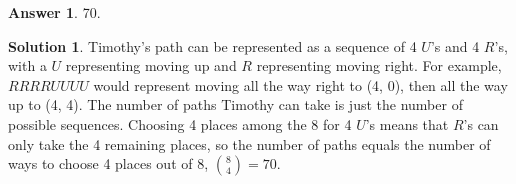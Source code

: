 \documentclass[11pt]{article}
\theoremstyle{definition}
\newtheorem*{solution}{Solution}
\newtheorem*{answer}{Answer}
\begin{document}
\begin{enumerate}
\begin{answer}
70.
\end{answer}
\begin{solution} Timothy's path can be represented as a sequence of 4 $U$'s and 4 $R$'s, with a $U$ representing moving up and $R$ representing moving right. For example, $RRRRUUUU$ would represent moving all the way right to (4, 0), then all the way up to (4, 4). The number of paths Timothy can take is just the number of possible sequences. Choosing 4 places among the 8 for 4 $U$'s means that $R$'s can only take the 4 remaining places, so the number of paths equals the number of ways to choose 4 places out of 8, $\displaystyle \binom{8}{4} = \boxed{70}$.
\end{solution}

\end{enumerate}
\end{document}

